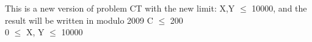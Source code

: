 This is a new version of problem CT with the new limit: X,Y $\le$ 10000, and the result will be written in modulo 2009
C  $\le$  200   
\\   0  $\le$  X, Y  $\le$  10000